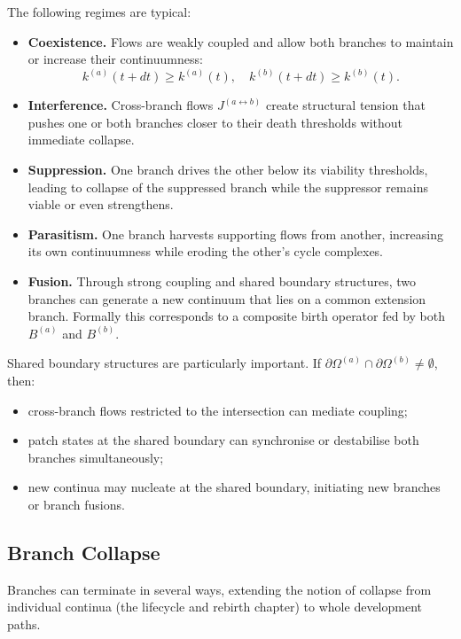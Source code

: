 The following regimes are typical:

\begin{itemize}
  \item \textbf{Coexistence.}\quad
        Flows are weakly coupled and allow both branches to maintain or
        increase their continuumness:
        \[
          k^{(a)}(t+dt) \ge k^{(a)}(t),\quad
          k^{(b)}(t+dt) \ge k^{(b)}(t).
        \]
  \item \textbf{Interference.}\quad
        Cross-branch flows \(J^{(a\leftrightarrow b)}\) create structural
        tension that pushes one or both branches closer to their death
        thresholds without immediate collapse.
  \item \textbf{Suppression.}\quad
        One branch drives the other below its viability thresholds, leading
        to collapse of the suppressed branch while the suppressor remains
        viable or even strengthens.
  \item \textbf{Parasitism.}\quad
        One branch harvests supporting flows from another, increasing its own
        continuumness while eroding the other's cycle complexes.
  \item \textbf{Fusion.}\quad
        Through strong coupling and shared boundary structures, two branches
        can generate a new continuum that lies on a common extension branch.
        Formally this corresponds to a composite birth operator fed by
        both \(B^{(a)}\) and \(B^{(b)}\).
\end{itemize}

Shared boundary structures are particularly important. If
\(\partial\Omega^{(a)}\cap\partial\Omega^{(b)}\neq\emptyset\), then:
\begin{itemize}
  \item cross-branch flows restricted to the intersection can mediate coupling;
  \item patch states at the shared boundary can synchronise or destabilise
        both branches simultaneously;
  \item new continua may nucleate at the shared boundary, initiating new
        branches or branch fusions.
\end{itemize}

\subsection{Branch Collapse}

Branches can terminate in several ways, extending the notion of collapse from
individual continua (the lifecycle and rebirth chapter) to whole development
paths.

